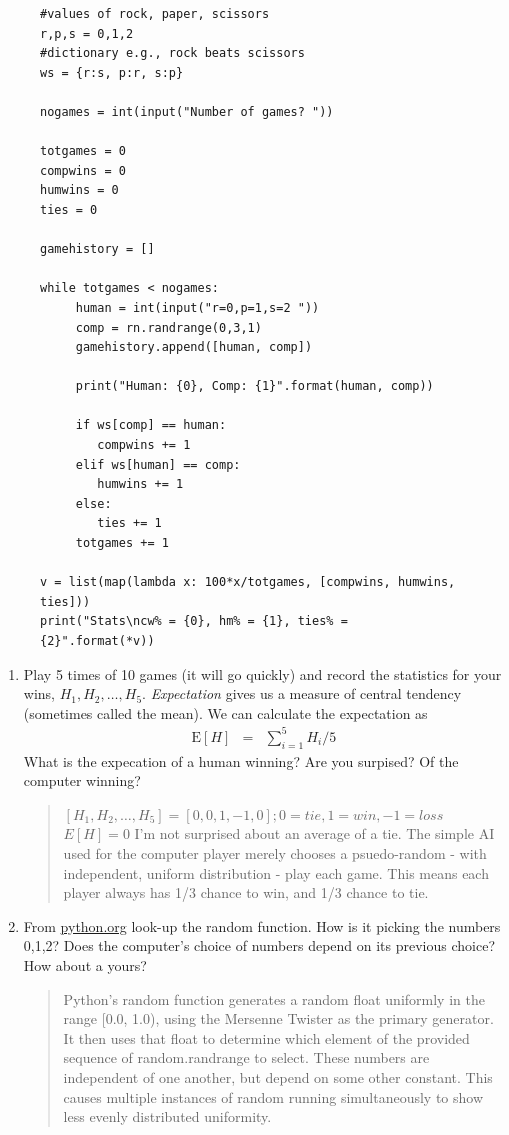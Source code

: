 \documentclass{article}
\begin{document}
\begin{enumerate}
\begin{figure}[h]
{\begin{verbatim}
#values of rock, paper, scissors
r,p,s = 0,1,2
#dictionary e.g., rock beats scissors
ws = {r:s, p:r, s:p}

nogames = int(input("Number of games? "))

totgames = 0
compwins = 0
humwins = 0
ties = 0

gamehistory = []

while totgames < nogames:
     human = int(input("r=0,p=1,s=2 "))
     comp = rn.randrange(0,3,1)
     gamehistory.append([human, comp])

     print("Human: {0}, Comp: {1}".format(human, comp))

     if ws[comp] == human:
        compwins += 1
     elif ws[human] == comp:
        humwins += 1
     else:
        ties += 1
     totgames += 1

v = list(map(lambda x: 100*x/totgames, [compwins, humwins, ties]))
print("Stats\ncw% = {0}, hm% = {1}, ties% = {2}".format(*v))
\end{verbatim}}
\end{figure}
\begin{enumerate}
\item Play 5 times of 10 games (it will go quickly) and record the statistics for your wins, $H_1, H_2, \ldots, H_5$.   {\it Expectation} gives us a measure of central tendency (sometimes called the mean).  We can calculate the expectation as
\begin{eqnarray*}
\mathrm{E}[H] &=& \sum_{i=1}^5 H_i/5
\end{eqnarray*}
What is the expecation of a human winning? Are you surpised? Of the computer winning?
\begin{quote}
$[H_1, H_2, \ldots, H_5] = [0, 0, 1, -1, 0]; 0 = tie, 1 = win, -1 = loss$\newline
$E[H] = 0$\newline
I'm not surprised about an average of a tie. The simple AI used for the computer player merely chooses a psuedo-random - with independent, uniform distribution - play each game. This means each player always has 1/3 chance to win, and 1/3 chance to tie.
\end{quote}
\item From \url{python.org} look-up the random function.  How is it picking the numbers 0,1,2?  Does the computer's choice of numbers depend on its previous choice? How about a yours?
\begin{quote}
Python's random function generates a random float uniformly in the range [0.0, 1.0), using the Mersenne Twister as the primary generator. It then uses that float to determine which element of the provided sequence of random.randrange to select. These numbers are independent of one another, but depend on some other constant. This causes multiple instances of random running simultaneously to show less evenly distributed uniformity.\newline

\end{quote}
\end{enumerate}
\end{enumerate}
\end{document}
